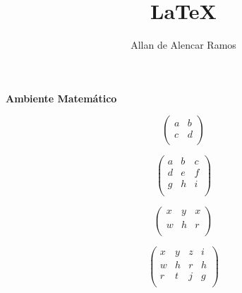 \documentclass[12pt, a4paper]{article}
\begin{document}
\title{LaTeX}
\author{Allan de Alencar Ramos}
\maketitle

\begin{center}
\large\textbf{Ambiente Matemático}
\end{center}
\vspace{0.5cm}



\begin{equation}
\left(
\begin{array}{lr}
	a & b \\
	c & d \\
\end{array}
\right)
\end{equation}

\begin{equation}
\left(
\begin{array}{lcr}
	a & b & c\\
	d & e &  f \\
	g & h & i \\
\end{array}
\right)
\end{equation}


\begin{equation}
\begin{pmatrix}
	x & y & x \\
	w & h & r \\
\end{pmatrix}
\end{equation}

\begin{equation}
\begin{pmatrix}
	x & y & z & i \\
	w & h & r & h \\
	r & t & j & g \\
\end{pmatrix}
\end{equation}
\end{document}
